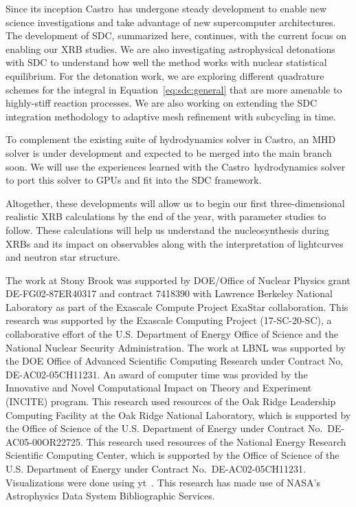 \documentclass[a4paper]{jpconf}
\newcommand{\castro}{{\sffamily Castro}}
\begin{document}
Since its inception \castro\ has undergone steady development to
enable new science investigations and take advantage of new
supercomputer architectures.  The development of SDC, summarized here,
continues, with the current focus on enabling our XRB studies.  We are
also investigating astrophysical detonations with SDC to understand
how well the method works with nuclear statistical equilibrium.  For
the detonation work, we are exploring different quadrature schemes for
the integral in Equation~\ref{eq:sdc:general} that are more amenable
to highly-stiff reaction processes.  We are also working on extending
the SDC integration methodology to adaptive mesh refinement with
subcycling in time.

To complement the existing suite of hydrodynamics solver in \castro,
an MHD solver is under development and expected to be merged into the
main branch soon.  We will use the experiences learned with the
\castro\ hydrodynamics solver to port this solver to GPUs and fit into
the SDC framework.

Altogether, these developments will allow us to begin our first
three-dimensional realistic XRB calculations by the end of the year,
with parameter studies to follow.  These calculations will help us
understand the nucleosynthesis during XRBs and its impact on
observables along with the interpretation of lightcurves and neutron star
structure.


\ack The work at Stony Brook was supported by DOE/Office of Nuclear
Physics grant DE-FG02-87ER40317 and contract 7418390 with Lawrence
Berkeley National Laboratory as part of the Exascale Compute Project
ExaStar collaboration.  This research was supported by the Exascale
Computing Project (17-SC-20-SC), a collaborative effort of the
U.S. Department of Energy Office of Science and the National Nuclear
Security Administration.  The work at LBNL was supported by the DOE
Office of Advanced Scientific Computing Research under Contract No,
DE-AC02-05CH11231.  An award of computer time was provided by the
Innovative and Novel Computational Impact on Theory and Experiment
(INCITE) program. This research used resources of the Oak Ridge
Leadership Computing Facility at the Oak Ridge National Laboratory,
which is supported by the Office of Science of the U.S. Department of
Energy under Contract No.\ DE-AC05-00OR22725.  This research used
resources of the National Energy Research Scientific Computing Center,
which is supported by the Office of Science of the U.S. Department of
Energy under Contract No.\ DE-AC02-05CH11231.  Visualizations were
done using yt~\cite{yt}.  This research has made use of NASA's
Astrophysics Data System Bibliographic Services.





\end{document}
